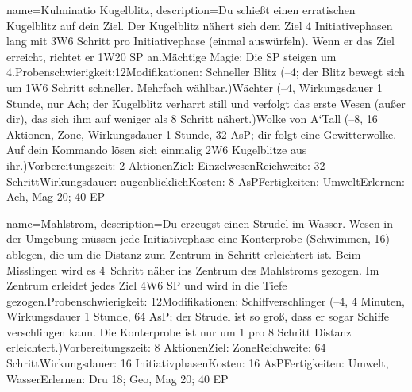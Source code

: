 {
    name={Kulminatio Kugelblitz},
    description={Du schießt einen erratischen Kugelblitz auf dein Ziel. Der Kugelblitz nähert sich dem Ziel 4 Initiativephasen lang mit 3W6 Schritt pro Initiativephase (einmal auswürfeln). Wenn er das Ziel erreicht, richtet er 1W20 SP an.\newline Mächtige Magie: Die SP steigen um 4.\newline Probenschwierigkeit:12\newline Modifikationen: Schneller Blitz (–4; der Blitz bewegt sich um 1W6 Schritt schneller. Mehrfach wählbar.)\newline Wächter (–4, Wirkungsdauer 1 Stunde, nur Ach; der Kugelblitz verharrt still und verfolgt das erste Wesen (außer dir), das sich ihm auf weniger als 8 Schritt nähert.)\newline Wolke von A‘Tall (–8, 16 Aktionen, Zone, Wirkungsdauer 1 Stunde, 32 AsP; dir folgt eine Gewitterwolke. Auf dein Kommando lösen sich einmalig 2W6 Kugelblitze aus ihr.)\newline Vorbereitungszeit: 2 Aktionen\newline Ziel: Einzelwesen\newline Reichweite: 32 Schritt\newline Wirkungsdauer: augenblicklich\newline Kosten: 8 AsP\newline Fertigkeiten: Umwelt\newline Erlernen: Ach, Mag 20; 40 EP}
}


{
    name={Mahlstrom},
    description={Du erzeugst einen Strudel im Wasser. Wesen in der Umgebung müssen jede Initiativephase eine Konterprobe (Schwimmen, 16) ablegen, die um die Distanz zum Zentrum in Schritt erleichtert ist. Beim Misslingen wird es 4 Schritt näher ins Zentrum des Mahlstroms gezogen. Im Zentrum erleidet jedes Ziel 4W6 SP und wird in die Tiefe gezogen.\newline Probenschwierigkeit: 12\newline Modifikationen: Schiffverschlinger (–4, 4 Minuten, Wirkungsdauer 1 Stunde, 64 AsP; der Strudel ist so groß, dass er sogar Schiffe verschlingen kann. Die Konterprobe ist nur um 1 pro 8 Schritt Distanz erleichtert.)\newline Vorbereitungszeit: 8 Aktionen\newline Ziel: Zone\newline Reichweite: 64 Schritt\newline Wirkungsdauer: 16 Initiativphasen\newline Kosten: 16 AsP\newline Fertigkeiten: Umwelt, Wasser\newline Erlernen: Dru 18; Geo, Mag 20; 40 EP}
}



